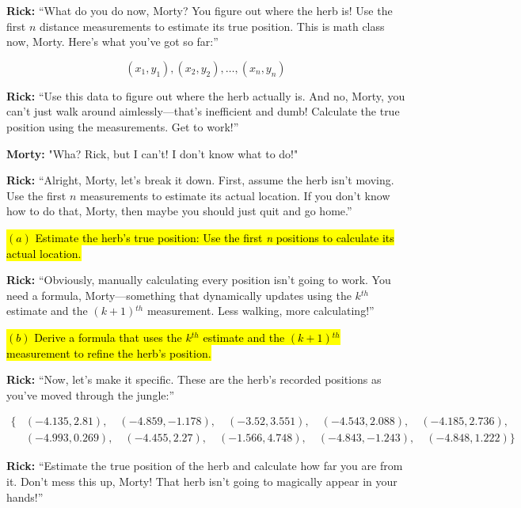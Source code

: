 \documentclass[a4paper, 12pt]{exam}
\begin{document}
\noindent \textbf{Rick:} “What do you do now, Morty? You figure out where the herb is! Use the first \(n\) distance measurements to estimate its true position. This is math class now, Morty. Here’s what you’ve got so far:”

\[
(x_1, y_1), (x_2, y_2), \dots, (x_n, y_n)
\]

\noindent \textbf{Rick:} “Use this data to figure out where the herb actually is. And no, Morty, you can’t just walk around aimlessly—that’s inefficient and dumb! Calculate the true position using the measurements. Get to work!”

\bigskip

\noindent \textbf{Morty:} "Wha? Rick, but I can't! I don't know what to do!"

\bigskip

\noindent \textbf{Rick:} “Alright, Morty, let’s break it down. First, assume the herb isn’t moving. Use the first \(n\) measurements to estimate its actual location. If you don’t know how to do that, Morty, then maybe you should just quit and go home.”

\bigskip
\hl{$(a)$ Estimate the herb's true position: Use the first \textit{n} positions to calculate its actual location.}
\bigskip

\noindent \textbf{Rick:} “Obviously, manually calculating every position isn’t going to work. You need a formula, Morty—something that dynamically updates using the \(k\)$^{th}$ estimate and the \((k+1)\)$^{th}$ measurement. Less walking, more calculating!”

\bigskip
\hl{$(b)$ Derive a formula that uses the $k$$^{th}$ estimate and the $(k+1)$$^{th}$ measurement to refine the herb's position.}

\bigskip

\noindent \textbf{Rick:} “Now, let’s make it specific. These are the herb’s recorded positions as you’ve moved through the jungle:”

\[
\begin{aligned}
\{ 
&(-4.135, 2.81), \quad (-4.859, -1.178), \quad (-3.52, 3.551), \quad (-4.543, 2.088), \quad  (-4.185, 2.736), \\
&(-4.993, 0.269), \quad (-4.455, 2.27), \quad (-1.566, 4.748), \quad (-4.843, -1.243), \quad (-4.848, 1.222)
\}
\end{aligned}
\]

\noindent \textbf{Rick:} “Estimate the true position of the herb and calculate how far you are from it. Don’t mess this up, Morty! That herb isn’t going to magically appear in your hands!”
\end{document}
